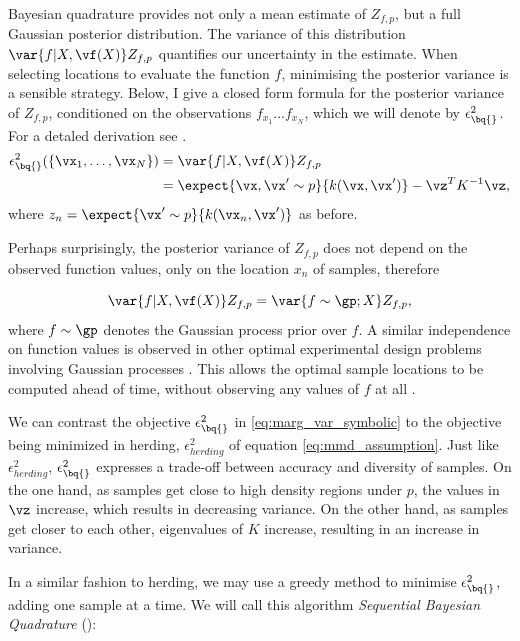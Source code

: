 Bayesian quadrature provides not only a mean estimate of $Z_{f,p}$, but a full Gaussian posterior distribution. The variance of this distribution $\var{f\vert X,\vf(X)} Z_{f,p}$ quantifies our uncertainty in the estimate. When selecting locations to evaluate the function $f$, minimising the posterior variance is a sensible strategy. Below, I give a closed form formula for the posterior variance of $Z_{f,p}$, conditioned on the observations $f_{x_1} \dots f_{x_N}$, which we will denote by $\epsilon^2_{\bq{}}$. For a detaled derivation see \citep{BZMonteCarlo}.
\begin{align}
	\epsilon^{2}_{\bq{}}(\{ \vx_1,\ldots,\vx_N \}) & = 
	\var{f\vert X,\vf(X)} Z_{f,p} \\
	& = \expect{\vx, \vx' \sim p}{k(\vx, \vx')} - \vz^T K^{-1} \vz\mbox{,}
		\label{eq:marg_var_symbolic}
\end{align}
%
where $z_n = \expect{\vx' \sim p}{k(\vx_n, \vx')}$ as before.

Perhaps surprisingly, the posterior variance of $Z_{f,p}$ does not depend on the observed function values, only on the location $x_n$ of samples, therefore

\begin{equation}
	\var{f\vert X,\vf(X)} Z_{f,p} = \var{f\sim \gp ; X} Z_{f,p},
\end{equation}
%
where $f\sim \gp$ denotes the Gaussian process prior over $f$. A similar independence on function values is observed in other optimal experimental design problems involving Gaussian processes \citep{guestrin1}. This allows the optimal sample locations to be computed ahead of time, without observing any values of $f$ at all \citep{minka2000dqr}.

We can contrast the \bq{} objective $\epsilon^{2}_{\bq{}}$ in \eqref{eq:marg_var_symbolic} to the objective being minimized in herding, $\epsilon^{2}_{herding}$ of equation \eqref{eq:mmd_assumption}. Just like $\epsilon^{2}_{herding}$, $\epsilon^{2}_{\bq{}}$ expresses a trade-off between accuracy and diversity of samples. On the one hand, as samples get close to high density regions under $p$, the values in $\vz$ increase, which results in decreasing variance. On the other hand, as samples get closer to each other, eigenvalues of $K$ increase, resulting in an increase in variance. 

In a similar fashion to herding, we may use a greedy method to minimise $\epsilon^{2}_{\bq{}}$, adding one sample at a time. We will call this algorithm \emph{Sequential Bayesian Quadrature} (\sbq{}):

